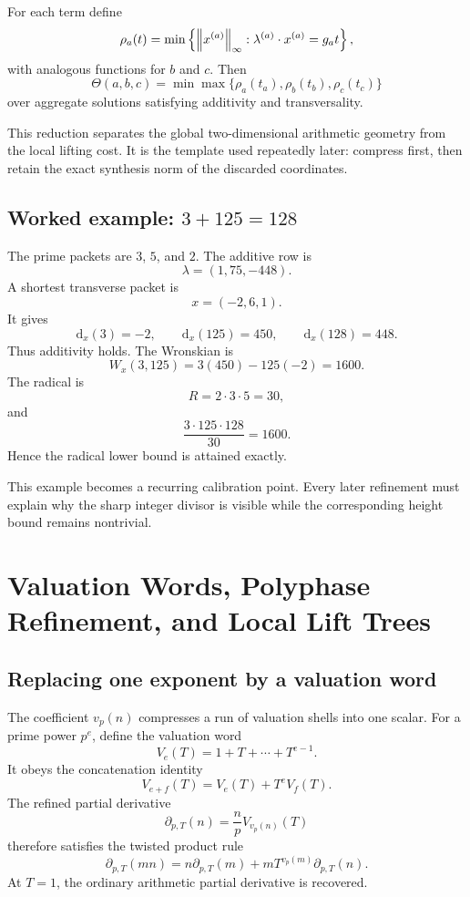 For each term define
\[
 \rho_a(t)
 =
 \min\left\{
 \left\lVert x^{(a)}\right\rVert_\infty:
 \lambda^{(a)}\cdot x^{(a)}=g_at
 \right\},
\]
with analogous functions for $b$ and $c$. Then
\[
 \Theta(a,b,c)
 =
 \min
 \max\{\rho_a(t_a),\rho_b(t_b),\rho_c(t_c)\}
\]
over aggregate solutions satisfying additivity and transversality.

This reduction separates the global two-dimensional arithmetic geometry from the local lifting cost. It is the template used repeatedly later: compress first, then retain the exact synthesis norm of the discarded coordinates.

\section{Worked example: \texorpdfstring{$3+125=128$}{3+125=128}}
The prime packets are $3$, $5$, and $2$. The additive row is
\[
 \lambda=(1,75,-448).
\]
A shortest transverse packet is
\[
 x=(-2,6,1).
\]
It gives
\[
 \mathrm d_x(3)=-2,
 \qquad
 \mathrm d_x(125)=450,
 \qquad
 \mathrm d_x(128)=448.
\]
Thus additivity holds. The Wronskian is
\[
 W_x(3,125)
 =3(450)-125(-2)
 =1600.
\]
The radical is
\[
 R=2\cdot3\cdot5=30,
\]
and
\[
 \frac{3\cdot125\cdot128}{30}=1600.
\]
Hence the radical lower bound is attained exactly.

This example becomes a recurring calibration point. Every later refinement must explain why the sharp integer divisor is visible while the corresponding height bound remains nontrivial.

\chapter{Valuation Words, Polyphase Refinement, and Local Lift Trees}

\section{Replacing one exponent by a valuation word}
The coefficient $v_p(n)$ compresses a run of valuation shells into one scalar. For a prime power $p^e$, define the valuation word
\[
 \boxed{
 V_e(T)=1+T+\cdots+T^{e-1}.
 }
\]
It obeys the concatenation identity
\[
 V_{e+f}(T)=V_e(T)+T^eV_f(T).
\]
The refined partial derivative
\[
 \partial_{p,T}(n)
 =
 \frac npV_{v_p(n)}(T)
\]
therefore satisfies the twisted product rule
\[
 \boxed{
 \partial_{p,T}(mn)
 =
 n\partial_{p,T}(m)
 +
 mT^{v_p(m)}\partial_{p,T}(n).
 }
\]
At $T=1$, the ordinary arithmetic partial derivative is recovered.


